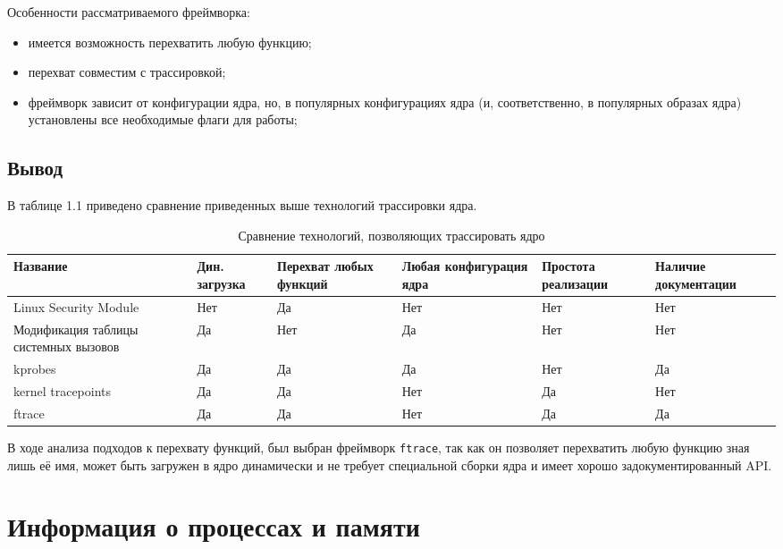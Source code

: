 Особенности рассматриваемого фреймворка:

\begin{itemize}
	\item имеется возможность перехватить любую функцию;
	\item перехват совместим с трассировкой;
	\item фреймворк зависит от конфигурации ядра, но, в популярных конфигурациях ядра (и, соответственно, в популярных образах ядра) установлены все необходимые флаги для работы; 
\end{itemize}

\subsection*{Вывод}

В таблице 1.1 приведено сравнение приведенных выше технологий трассировки ядра. 

\begin{table}[h]
	\centering
	\label{tab:analyze}
	\begin{tabular}{ | p{3cm} | p{2cm} | p{2cm} | p{2cm} | p{2cm} | p{2cm} | }
		\hline
		Название & Дин. загрузка & Перехват любых функций & Любая конфигурация ядра & Простота реализации & Наличие документации \\
		\hline
		Linux Security Module & Нет & Да & Нет & Нет & Нет \\
		\hline
		Модификация таблицы системных вызовов & Да & Нет & Да & Нет & Нет \\
		\hline
		kprobes & Да & Да & Да & Нет & Да \\
		\hline
		kernel tracepoints & Да & Да & Нет & Да & Нет \\
		\hline
		ftrace & Да & Да & Нет & Да & Да \\
		\hline
	\end{tabular}
	\caption{Сравнение технологий, позволяющих трассировать ядро}
\end{table}

В ходе анализа подходов к перехвату функций, был выбран фреймворк \texttt{ftrace}, так как он позволяет перехватить любую функцию зная лишь её имя, может быть загружен в ядро динамически и не требует специальной сборки ядра и имеет хорошо задокументированный API.

\section{Информация о процессах и памяти}

